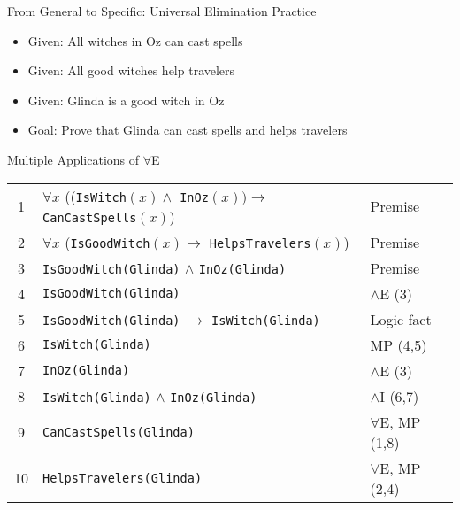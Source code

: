 \documentclass{beamer}
\begin{document}
	\begin{frame}{From General to Specific: Universal Elimination Practice}
		\begin{itemize}
			\item Given: All witches in Oz can cast spells
			\item Given: All good witches help travelers
			\item Given: Glinda is a good witch in Oz
			\item Goal: Prove that Glinda can cast spells and helps travelers
		\end{itemize}
		
		\begin{block}{Multiple Applications of $\forall$E}
			\small
			\begin{tabular}{|c|l|l|}
				\hline
				1 & $\forall x$ ((\texttt{IsWitch}$(x) \land$ \texttt{InOz}$(x)) \rightarrow$ \texttt{CanCastSpells}$(x)$) & Premise \\
				2 & $\forall x$ (\texttt{IsGoodWitch}$(x) \rightarrow$ \texttt{HelpsTravelers}$(x)$) & Premise \\
				3 & \texttt{IsGoodWitch(Glinda)} $\land$ \texttt{InOz(Glinda)} & Premise \\
				4 & \texttt{IsGoodWitch(Glinda)} & $\land$E (3) \\
				5 & \texttt{IsGoodWitch(Glinda)} $\rightarrow$ \texttt{IsWitch(Glinda)} & Logic fact \\
				6 & \texttt{IsWitch(Glinda)} & MP (4,5) \\
				7 & \texttt{InOz(Glinda)} & $\land$E (3) \\
				8 & \texttt{IsWitch(Glinda)} $\land$ \texttt{InOz(Glinda)} & $\land$I (6,7) \\
				9 & \texttt{CanCastSpells(Glinda)} & $\forall$E, MP (1,8) \\
				10 & \texttt{HelpsTravelers(Glinda)} & $\forall$E, MP (2,4) \\
				\hline
			\end{tabular}
		\end{block}
	\end{frame}
	
\end{document}
